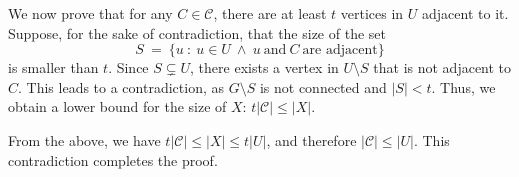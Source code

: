 \documentclass[12pt]{article}
\begin{document}
	\medskip
	
	We now prove that for any \(C \in \mathcal{C}\), there are at least \(t\)
	vertices in \(U\) adjacent to it. Suppose, for the sake of contradiction,
	that the size of the set
	\[ S \ = \ \{u \ : \ u \in U \ \wedge \ u \ \text{and} \ C \
	\text{are adjacent}\} \]
	is smaller than \(t\). Since \(S \subsetneq U\), there exists a vertex in
	\(U \setminus S\) that is not adjacent to \(C\). This leads to a
	contradiction, as \(G \setminus S\) is not connected and \(|S| < t\). Thus,
	we obtain a lower bound for the size of \(X\): \(t |\mathcal{C}| \leqslant
	|X|\).
	
	\medskip
	
	From the above, we have \(t |\mathcal{C}| \leqslant |X| \leqslant t |U|\),
	and therefore \(|\mathcal{C}| \leqslant |U|\). This contradiction completes
	the proof.
\end{document}
